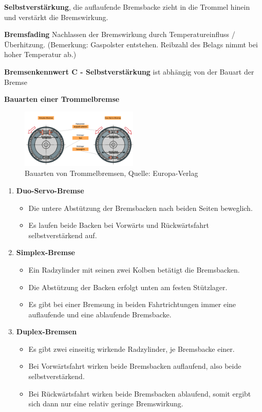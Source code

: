 \textbf{Selbstverstärkung}, die auflaufende Bremsbacke zieht in die
Trommel hinein und verstärkt die Bremswirkung.

\textbf{Bremsfading} Nachlassen der Bremswirkung durch
Temperatureinfluss / Überhitzung. (Bemerkung: Gaspolster entstehen.
Reibzahl des Belags nimmt bei hoher Temperatur ab.)

\textbf{Bremsenkennwert C - Selbstverstärkung} ist abhängig von der
Bauart der Bremse

\textbf{Bauarten einer Trommelbremse}

\begin{figure}[!ht]%
\centering
\includegraphics[width=0.5\textwidth]{images/Bremsen/Bremsen-4.pdf}
\caption{Bauarten von Trommelbremsen, Quelle: Europa-Verlag}
\end{figure}

\begin{enumerate}
\item
  \textbf{Duo-Servo-Bremse}

  \begin{itemize}
  \item
    Die untere Abstützung der Bremsbacken nach beiden Seiten beweglich.
  \item
    Es laufen beide Backen bei Vorwärts und Rückwärtsfahrt
    selbstverstärkend auf.
  \end{itemize}
\item
  \textbf{Simplex-Bremse}

  \begin{itemize}
  \item
    Ein Radzylinder mit seinen zwei Kolben betätigt die Bremsbacken.
  \item
    Die Abstützung der Backen erfolgt unten am festen Stützlager.
  \item
    Es gibt bei einer Bremsung in beiden Fahrtrichtungen immer eine
    auflaufende und eine ablaufende Bremsbacke.
  \end{itemize}
\item
  \textbf{Duplex-Bremsen}

  \begin{itemize}
  \item
    Es gibt zwei einseitig wirkende Radzylinder, je Bremsbacke einer.
  \item
    Bei Vorwärtsfahrt wirken beide Bremsbacken auflaufend, also beide
    selbstverstärkend.
  \item
    Bei Rückwärtsfahrt wirken beide Bremsbacken ablaufend, somit ergibt
    sich dann nur eine relativ geringe Bremswirkung.
  \end{itemize}
\end{enumerate}

